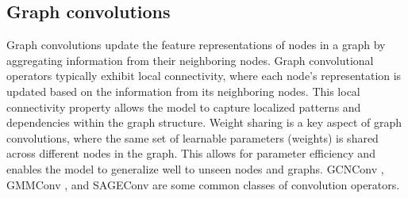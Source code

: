 \subsection{Graph convolutions}
Graph convolutions update the feature representations of nodes in a graph by aggregating information from their neighboring nodes. Graph convolutional operators typically exhibit local connectivity, where each node's representation is updated based on the information from its neighboring nodes. This local connectivity property allows the model to capture localized patterns and dependencies within the graph structure. Weight sharing is a key aspect of graph convolutions, where the same set of learnable parameters (weights) is shared across different nodes in the graph. This allows for parameter efficiency and enables the model to generalize well to unseen nodes and graphs. GCNConv \cite{kipf}, GMMConv \cite{MoNet}, and SAGEConv \cite{SAGE} are some common classes of convolution operators.
